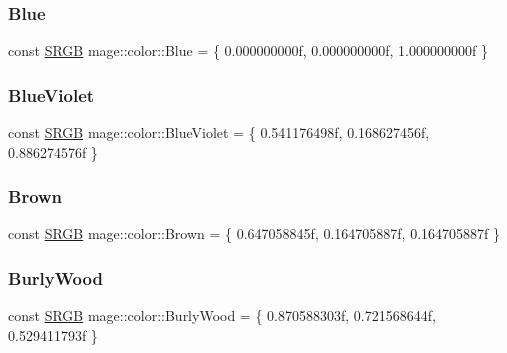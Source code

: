 \subsubsection{\texorpdfstring{Blue}{Blue}}
{\footnotesize\ttfamily const \hyperlink{structmage_1_1_s_r_g_b}{S\+R\+GB} mage\+::color\+::\+Blue = \{ 0.\+000000000f, 0.\+000000000f, 1.\+000000000f \}}

\hypertarget{namespacemage_1_1color_a45f285944aae0dacfd6dddd30f3db877}{}\label{namespacemage_1_1color_a45f285944aae0dacfd6dddd30f3db877} 
\subsubsection{\texorpdfstring{Blue\+Violet}{BlueViolet}}
{\footnotesize\ttfamily const \hyperlink{structmage_1_1_s_r_g_b}{S\+R\+GB} mage\+::color\+::\+Blue\+Violet = \{ 0.\+541176498f, 0.\+168627456f, 0.\+886274576f \}}

\hypertarget{namespacemage_1_1color_aa40aa48abd7f6612c43fb03b024834fb}{}\label{namespacemage_1_1color_aa40aa48abd7f6612c43fb03b024834fb} 
\subsubsection{\texorpdfstring{Brown}{Brown}}
{\footnotesize\ttfamily const \hyperlink{structmage_1_1_s_r_g_b}{S\+R\+GB} mage\+::color\+::\+Brown = \{ 0.\+647058845f, 0.\+164705887f, 0.\+164705887f \}}

\hypertarget{namespacemage_1_1color_af0e60a4c37b5d5bbf06e841846684c69}{}\label{namespacemage_1_1color_af0e60a4c37b5d5bbf06e841846684c69} 
\subsubsection{\texorpdfstring{Burly\+Wood}{BurlyWood}}
{\footnotesize\ttfamily const \hyperlink{structmage_1_1_s_r_g_b}{S\+R\+GB} mage\+::color\+::\+Burly\+Wood = \{ 0.\+870588303f, 0.\+721568644f, 0.\+529411793f \}}

\hypertarget{namespacemage_1_1color_abf24a2bd6573f76af6a0f40af5f3c381}{}\label{namespacemage_1_1color_abf24a2bd6573f76af6a0f40af5f3c381} 
